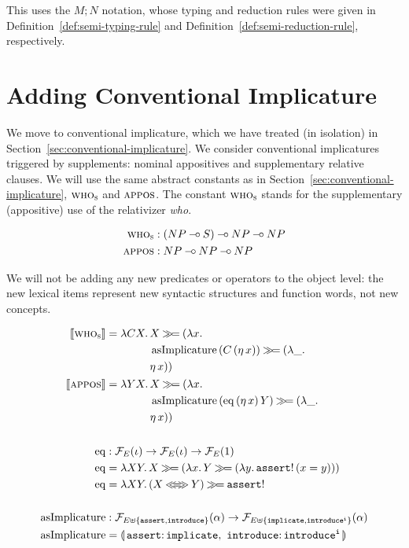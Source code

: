 This uses the $M; N$ notation, whose typing and reduction rules were given
in Definition~\ref{def:semi-typing-rule} and
Definition~\ref{def:semi-reduction-rule}, respectively.


\section{Adding Conventional Implicature}
\label{sec:adding-conventional-implicature}

We move to conventional implicature, which we have treated (in isolation)
in Section~\ref{sec:conventional-implicature}. We consider conventional
implicatures triggered by supplements: nominal appositives and
supplementary relative clauses. We will use the same abstract constants as
in Section~\ref{sec:conventional-implicature}, $\textsc{who}_{\textsc{s}}$ and
$\textsc{appos}$. The constant $\textsc{who}_{\textsc{s}}$ stands for the
supplementary (appositive) use of the relativizer \emph{who}.

\begin{align*}
  \textsc{who}_{\textsc{s}} &: (NP \mathbin{{-}\mkern-3.5mu{\circ}} S) \mathbin{{-}\mkern-3.5mu{\circ}} NP \mathbin{{-}\mkern-3.5mu{\circ}} NP \\
  \textsc{appos} &: NP \mathbin{{-}\mkern-3.5mu{\circ}} NP \mathbin{{-}\mkern-3.5mu{\circ}} NP
\end{align*}

We will not be adding any new predicates or operators to the object level:
the new lexical items represent new syntactic structures and function
words, not new concepts.

\begin{align*}
  \sem{\abs{who}_{\abs{s}}} &= \lam{C X}{\begin{aligned}[t]
      &X \hsbind (\lam{x}{ \\
      &\ap{\asImplicature}{(\ap{C}{(\etaE{x})})} \hsbind (\lam{\_}{ \\
      &\etaE{x}})})
    \end{aligned}} \\
  \lex{appos}{\lam{Y X}{\begin{aligned}[t]
      &X \hsbind (\lam{x}{ \\
      &\ap{\asImplicature}{(\app{\eq}{(\etaE{x})}{Y})} \hsbind (\lam{\_}{ \\
      &\etaE{x}})})
    \end{aligned}}} \\
  \\
  \eq &: \FF_E(\iota) \to \FF_E(\iota) \to \FF_E(1) \\
  \eq &= \lam{X Y}{X \hsbind (\lam{x}{Y \hsbind (\lam{y}{\ap{\op{assert}!}{(x = y)}})})} \\
  \eq &= \lam{X Y}{(X \eqlr Y) \hsbind \op{assert}!} \\
  \\
  \asImplicature &: \FF_{E \uplus \{\op{assert},\op{introduce}\}}(\alpha) \to
                    \FF_{E \uplus \{\op{implicate},\op{introduce^i}\}}(\alpha) \\
  \asImplicature &= \banana{\onto{\op{assert}}{\op{implicate}},\
                            \onto{\op{introduce}}{\op{introduce^i}}}
\end{align*}

